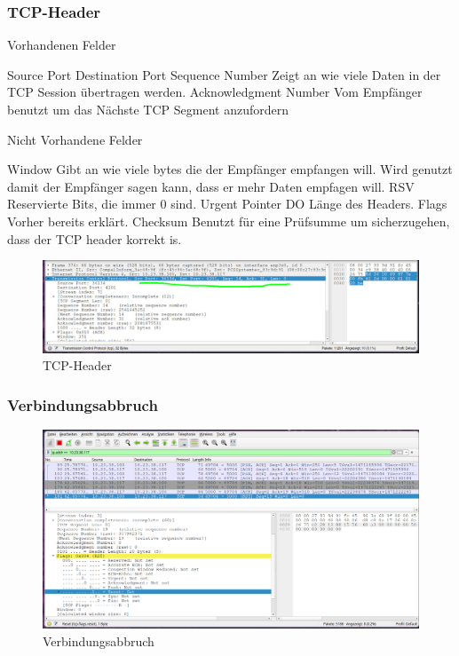 \documentclass[a4paper]{article}
\begin{document}
\subsubsection{TCP-Header}
Vorhandenen Felder
\begin{outline}
	\1 Source Port
	\1 Destination Port
	\1 Sequence Number
	\2 Zeigt an wie viele Daten in der TCP Session übertragen werden.
	\1 Acknowledgment Number
	\2 Vom Empfänger benutzt um das Nächste TCP Segment anzufordern
\end{outline}
Nicht Vorhandene Felder
\begin{outline}
	\1 Window
	\2 Gibt an wie viele bytes die der Empfänger empfangen will. Wird genutzt damit der Empfänger sagen kann, dass er mehr Daten empfagen will.
	\1 RSV
	 Reservierte Bits, die immer 0 sind.
	\1 Urgent Pointer
	\1 DO
	\2 Länge des Headers.
	\1 Flags
	\2 Vorher bereits erklärt.
	\1 Checksum
	\2 Benutzt für eine Prüfsumme um sicherzugehen, dass der TCP header korrekt is.
\end{outline}
\cite{TCP-Header}
\begin{figure}[h]
	\includegraphics[scale=0.2]{images/tcp-header.jpeg}
	\caption{TCP-Header}
\end{figure}
\newpage
\subsubsection{Verbindungsabbruch}
\begin{figure}[ht]
	\includegraphics[scale=0.2]{images/verbindungsabbruch.png}
	\caption{Verbindungsabbruch}
\end{figure}
\end{document}
